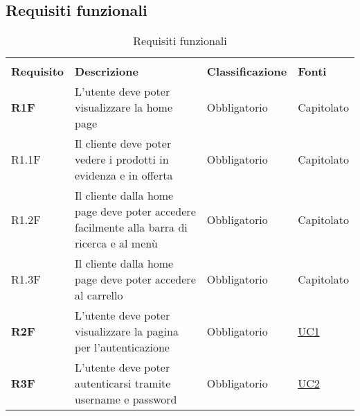 \subsection{Requisiti funzionali}
\begin{center}
    \centering
    \renewcommand{\arraystretch}{1.8}
    \label{tab:RequisitiFunzionali}
    \begin{longtable}[!h]{p{50px} p{245px} p{75px} p{50px}}
        \rowcolor{white}\caption{Requisiti funzionali}                                                                                                                                                                          \\
        \rowcolor{logo!70} \textbf{Requisito} & \textbf{Descrizione}                                                                                & \textbf{Classificazione} & \textbf{Fonti}                                 \\
        \textbf{R1F}                          & L'utente deve poter visualizzare la home page                                                       & Obbligatorio             & Capitolato                                     \\
        R1.1F                                 & Il cliente deve poter vedere i prodotti in evidenza e in offerta                                    & Obbligatorio             & Capitolato                                     \\
        R1.2F                                 & Il cliente dalla home page deve poter accedere facilmente alla barra di ricerca e al menù           & Obbligatorio             & Capitolato                                     \\
        R1.3F                                 & Il cliente dalla home page deve poter accedere al carrello                                          & Obbligatorio             & Capitolato                                     \\
        \textbf{R2F}                          & L'utente deve poter visualizzare la pagina per l'autenticazione                                     & Obbligatorio             & \hyperref[sec:UC1]{UC1}                        \\
        \textbf{R3F}                          & L'utente deve poter autenticarsi tramite username e password                                        & Obbligatorio             & \hyperref[sec:UC2]{UC2}                        \\

\end{longtable}
\end{center}
